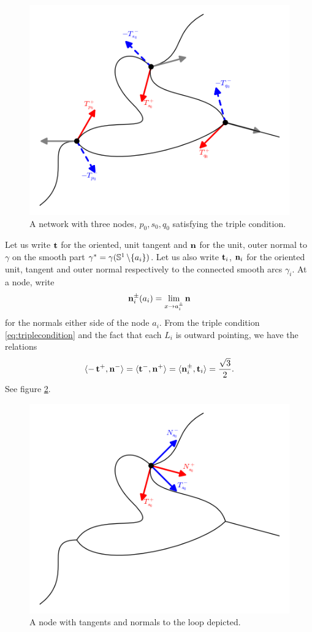 \documentclass[12pt]{amsart}
\begin{document}
\begin{figure}[htb]
\centering
\includegraphics[width=.9\linewidth]{network}
\caption{A network with three nodes, $p_0, s_0, q_0$ satisfying the triple condition.}
\label{fg:network}
\end{figure}

Let us write \(\operatorname{\mathbf{t}}\) for the oriented, unit tangent and \(\operatorname{\mathbf{n}}\) for the unit, outer normal to \(\gamma\) on the smooth part \(\gamma^{\ast} = \gamma(\mathbb{S}^1\operatorname{\backslash}\{a_i\})\). Let us also write \(\operatorname{\mathbf{t}}_i\), \(\operatorname{\mathbf{n}}_i\) for the oriented unit, tangent and outer normal respectively to the connected smooth arcs \(\gamma_i\). At a node, write
\[
\operatorname{\mathbf{n}}_i^{\pm}(a_i) = \lim_{x\to a_i^{\pm}} \operatorname{\mathbf{n}}
\]
for the normals either side of the node \(a_i\). From the triple condition \eqref{eq:triplecondition} and the fact that each \(L_i\) is outward pointing, we have the relations
\begin{equation}
\label{eq:triplerelations}
\langle{-\operatorname{\mathbf{t}}^+},{\operatorname{\mathbf{n}}^-}\rangle = \langle{\operatorname{\mathbf{t}}^-},{\operatorname{\mathbf{n}}^+}\rangle = \langle{\operatorname{\mathbf{n}}_i^{\pm}},{\operatorname{\mathbf{t}}_i}\rangle = \frac{\sqrt{3}}{2}.
\end{equation}
See figure \ref{fg:node}.
\begin{figure}[htb]
\centering
\includegraphics[width=.9\linewidth]{node}
\caption{A node with tangents and normals to the loop depicted.}
\label{fg:node}
\end{figure}
\end{document}
